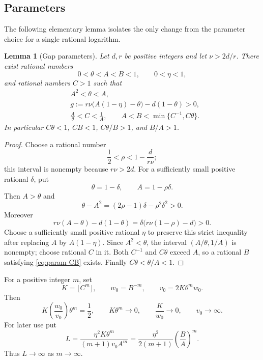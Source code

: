 \documentclass[11pt]{article}
\newtheorem{lemma}[theorem]{Lemma}
\theoremstyle{definition}
\theoremstyle{remark}
\numberwithin{equation}{section}
\begin{document}
\subsection{Parameters}

The following elementary lemma isolates the only change from the
parameter choice for a single rational logarithm.

\begin{lemma}[Gap parameters]\label{lem:parameters}
Let $d,r$ be positive integers and let $\nu>2d/r$.  There exist rational
numbers
\[
 0<\theta<A<B<1,\qquad 0<\eta<1,
\]
and rational numbers $C>1$ such that
\begin{align}
 &A^2<\theta<A,
 \label{eq:param1}\\
 &g:=r\nu\bigl(A(1-\eta)-\theta\bigr)-d(1-\theta)>0,
 \label{eq:param-gap}\\
 &\frac A\theta<C<\frac1A,
 \qquad
 A<B<\min\{C^{-1},C\theta\}.
 \label{eq:param-CB}
\end{align}
In particular $C\theta<1$, $CB<1$, $C\theta/B>1$, and $B/A>1$.
\end{lemma}

\begin{proof}
Choose a rational number
\[
 \frac12<\rho<1-\frac{d}{r\nu};
\]
this interval is nonempty because $r\nu>2d$.  For a sufficiently small
positive rational $\delta$, put
\[
 \theta=1-\delta,\qquad A=1-\rho\delta.
\]
Then $A>\theta$ and
\[
 \theta-A^2=(2\rho-1)\delta-\rho^2\delta^2>0.
\]
Moreover
\[
 r\nu(A-\theta)-d(1-\theta)
 =\delta\bigl(r\nu(1-\rho)-d\bigr)>0.
\]
Choose a sufficiently small positive rational $\eta$ to preserve this
strict inequality after replacing $A$ by $A(1-\eta)$.  Since
$A^2<\theta$, the interval $(A/\theta,1/A)$ is nonempty; choose rational
$C$ in it.  Both $C^{-1}$ and $C\theta$ exceed $A$, so a rational $B$
satisfying \eqref{eq:param-CB} exists.  Finally
$C\theta<\theta/A<1$.
\end{proof}

For a positive integer $m$, set
\begin{equation}\label{eq:dimension-parameters}
 K=\lfloor C^m\rfloor,
 \qquad w_0=B^{-m},
 \qquad v_0=2K\theta^m w_0.
\end{equation}
Then
\begin{equation}\label{eq:parameter-limits}
 K\left(\frac{w_0}{v_0}\right)\theta^m=\frac12,
 \qquad K\theta^m\longrightarrow0,
 \qquad \frac K{w_0}\longrightarrow0,
 \qquad v_0\longrightarrow\infty.
\end{equation}
For later use put
\begin{equation}\label{eq:L-def}
 L=\frac{\eta^2K\theta^m}{(m+1)v_0A^m}
   =\frac{\eta^2}{2(m+1)}\left(\frac BA\right)^m.
\end{equation}
Thus $L\to\infty$ as $m\to\infty$.
\end{document}
